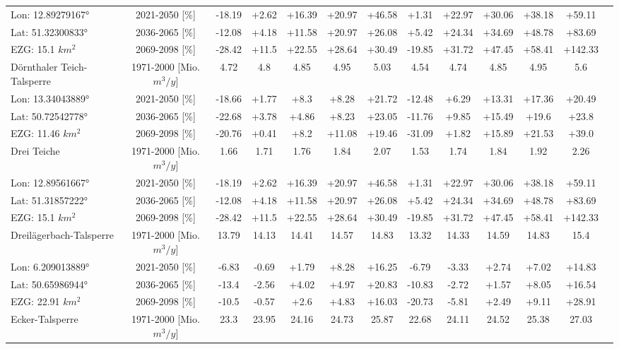 \begin{longtable}{@{\extracolsep{\fill}}lc|ccccc||cccccc}
\cline{2-12} 
Lon: 12.89279167° & 2021-2050 [\%]  & -18.19 & +2.62 & +16.39 & +20.97 & +46.58 & +1.31 & +22.97 & +30.06 & +38.18 & +59.11\\ 
Lat: 51.32300833° & 2036-2065 [\%]  & -12.08 & +4.18 & +11.58 & +20.97 & +26.08 & +5.42 & +24.34 & +34.69 & +48.78 & +83.69\\ 
EZG: 15.1 $km^2$ & 2069-2098 [\%]  & -28.42 & +11.5 & +22.55 & +28.64 & +30.49 & -19.85 & +31.72 & +47.45 & +58.41 & +142.33\\ 
\hline 
Dörnthaler Teich-Talsperre & 1971-2000 [Mio. $m^3/y$]  & 4.72 & 4.8 & 4.85 & 4.95 & 5.03 & 4.54 & 4.74 & 4.85 & 4.95 & 5.6\\ 
\cline{2-12} 
Lon: 13.34043889° & 2021-2050 [\%]  & -18.66 & +1.77 & +8.3 & +8.28 & +21.72 & -12.48 & +6.29 & +13.31 & +17.36 & +20.49\\ 
Lat: 50.72542778° & 2036-2065 [\%]  & -22.68 & +3.78 & +4.86 & +8.23 & +23.05 & -11.76 & +9.85 & +15.49 & +19.6 & +23.8\\ 
EZG: 11.46 $km^2$ & 2069-2098 [\%]  & -20.76 & +0.41 & +8.2 & +11.08 & +19.46 & -31.09 & +1.82 & +15.89 & +21.53 & +39.0\\ 
\hline 
Drei Teiche & 1971-2000 [Mio. $m^3/y$]  & 1.66 & 1.71 & 1.76 & 1.84 & 2.07 & 1.53 & 1.74 & 1.84 & 1.92 & 2.26\\ 
\cline{2-12} 
Lon: 12.89561667° & 2021-2050 [\%]  & -18.19 & +2.62 & +16.39 & +20.97 & +46.58 & +1.31 & +22.97 & +30.06 & +38.18 & +59.11\\ 
Lat: 51.31857222° & 2036-2065 [\%]  & -12.08 & +4.18 & +11.58 & +20.97 & +26.08 & +5.42 & +24.34 & +34.69 & +48.78 & +83.69\\ 
EZG: 15.1 $km^2$ & 2069-2098 [\%]  & -28.42 & +11.5 & +22.55 & +28.64 & +30.49 & -19.85 & +31.72 & +47.45 & +58.41 & +142.33\\ 
\hline 
Dreilägerbach-Talsperre & 1971-2000 [Mio. $m^3/y$]  & 13.79 & 14.13 & 14.41 & 14.57 & 14.83 & 13.32 & 14.33 & 14.59 & 14.83 & 15.4\\ 
\cline{2-12} 
Lon: 6.209013889° & 2021-2050 [\%]  & -6.83 & -0.69 & +1.79 & +8.28 & +16.25 & -6.79 & -3.33 & +2.74 & +7.02 & +14.83\\ 
Lat: 50.65986944° & 2036-2065 [\%]  & -13.4 & -2.56 & +4.02 & +4.97 & +20.83 & -10.83 & -2.72 & +1.57 & +8.05 & +16.54\\ 
EZG: 22.91 $km^2$ & 2069-2098 [\%]  & -10.5 & -0.57 & +2.6 & +4.83 & +16.03 & -20.73 & -5.81 & +2.49 & +9.11 & +28.91\\ 
\hline 
Ecker-Talsperre & 1971-2000 [Mio. $m^3/y$]  & 23.3 & 23.95 & 24.16 & 24.73 & 25.87 & 22.68 & 24.11 & 24.52 & 25.38 & 27.03\\ 

\end{longtable}
